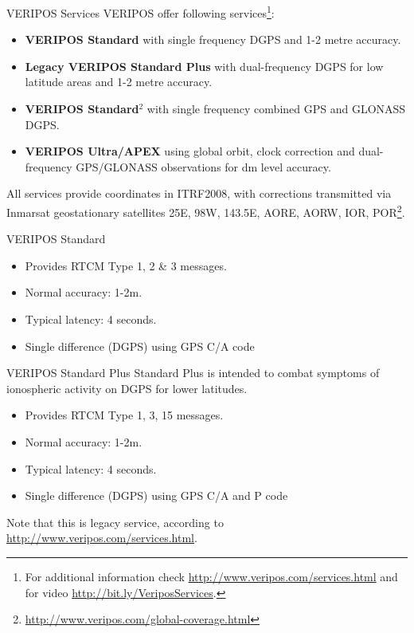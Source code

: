 \documentclass[11pt]{beamer}
\begin{document}
\begin{frame}{VERIPOS Services}
	VERIPOS offer following services\footnote[frame]{For additional information check \url{http://www.veripos.com/services.html} and for video \url{http://bit.ly/VeriposServices}.}:

	\begin{itemize}
		\item \textbf{VERIPOS Standard} with single frequency DGPS and 1-2 metre accuracy.
		\item {\color{gray}\textbf{Legacy VERIPOS Standard Plus} with dual-frequency DGPS for low latitude areas and 1-2 metre accuracy.} 
		\item \textbf{VERIPOS Standard$^2$ } with single frequency combined GPS and GLONASS DGPS. 
		\item \textbf{VERIPOS Ultra/APEX} using global orbit, clock correction and dual-frequency GPS/GLONASS observations for dm level accuracy.
	\end{itemize}
 All services provide coordinates in ITRF2008, with corrections transmitted via Inmarsat geostationary satellites 25E, 98W, 143.5E, AORE, AORW, IOR, POR\footnote[frame]{\url{http://www.veripos.com/global-coverage.html}}.
\end{frame}

\begin{frame}{VERIPOS Standard}
	
	\begin{itemize}	
	\item Provides RTCM Type 1, 2 \& 3 messages.
	\item Normal accuracy: 1-2m. 
	\item Typical latency: 4 seconds.
	\item Single difference (DGPS) using GPS C/A code
	\end{itemize}	
	
\end{frame}

\begin{frame}{VERIPOS Standard Plus}
	Standard Plus is intended to combat symptoms of ionospheric activity on DGPS for lower latitudes. 
	\begin{itemize}	
		\item Provides RTCM Type 1, 3, 15 messages.
		\item Normal accuracy: 1-2m. 
		\item Typical latency: 4 seconds.
		\item Single difference (DGPS) using GPS C/A and P code
	\end{itemize}	
	Note that this is legacy service, according to \url{http://www.veripos.com/services.html}.
\end{frame}	
\end{document}
